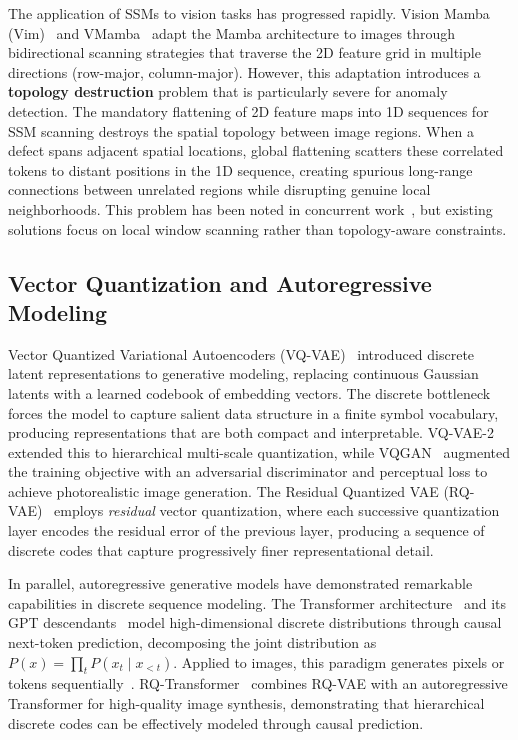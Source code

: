\documentclass[lettersize,journal]{IEEEtran}
\begin{document}
The application of SSMs to vision tasks has progressed rapidly. Vision Mamba (Vim)~\cite{zhu2024vim} and VMamba~\cite{liu2024vmamba} adapt the Mamba architecture to images through bidirectional scanning strategies that traverse the 2D feature grid in multiple directions (row-major, column-major). However, this adaptation introduces a \textbf{topology destruction} problem that is particularly severe for anomaly detection. The mandatory flattening of 2D feature maps into 1D sequences for SSM scanning destroys the spatial topology between image regions. When a defect spans adjacent spatial locations, global flattening scatters these correlated tokens to distant positions in the 1D sequence, creating spurious long-range connections between unrelated regions while disrupting genuine local neighborhoods. This problem has been noted in concurrent work~\cite{huang2024localmamba,liang2024mambair}, but existing solutions focus on local window scanning rather than topology-aware constraints.

\subsection{Vector Quantization and Autoregressive Modeling}

Vector Quantized Variational Autoencoders (VQ-VAE)~\cite{oord2017vqvae} introduced discrete latent representations to generative modeling, replacing continuous Gaussian latents with a learned codebook of embedding vectors. The discrete bottleneck forces the model to capture salient data structure in a finite symbol vocabulary, producing representations that are both compact and interpretable. VQ-VAE-2~\cite{razavi2019vqvae2} extended this to hierarchical multi-scale quantization, while VQGAN~\cite{esser2021vqgan} augmented the training objective with an adversarial discriminator and perceptual loss to achieve photorealistic image generation. The Residual Quantized VAE (RQ-VAE)~\cite{lee2022rqvae} employs \textit{residual} vector quantization, where each successive quantization layer encodes the residual error of the previous layer, producing a sequence of discrete codes that capture progressively finer representational detail.

In parallel, autoregressive generative models have demonstrated remarkable capabilities in discrete sequence modeling. The Transformer architecture~\cite{vaswani2017attention} and its GPT descendants~\cite{radford2018gpt,brown2020gpt3} model high-dimensional discrete distributions through causal next-token prediction, decomposing the joint distribution as $P(x) = \prod_t P(x_t \mid x_{<t})$. Applied to images, this paradigm generates pixels or tokens sequentially~\cite{parmar2018imagetransformer,chen2020igpt}. RQ-Transformer~\cite{lee2022rqvae} combines RQ-VAE with an autoregressive Transformer for high-quality image synthesis, demonstrating that hierarchical discrete codes can be effectively modeled through causal prediction.
\end{document}
